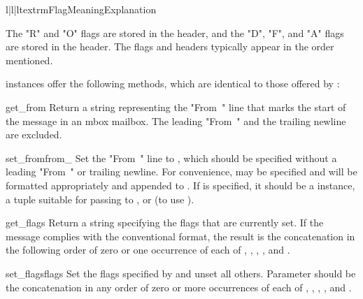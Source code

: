 \begin{tableiii}{l|l|l}{textrm}{Flag}{Meaning}{Explanation}
\end{tableiii}

The "R" and "O" flags are stored in the  header, and the
"D", "F", and "A" flags are stored in the  header. The
flags and headers typically appear in the order mentioned.

 instances offer the following methods, which are identical
to those offered by :

\begin{methoddesc}{get_from}{}
Return a string representing the "From~" line that marks the start of the
message in an mbox mailbox. The leading "From~" and the trailing newline are
excluded.
\end{methoddesc}

\begin{methoddesc}{set_from}{from_}
Set the "From~" line to , which should be specified without a
leading "From~" or trailing newline. For convenience,  may be
specified and will be formatted appropriately and appended to . If
 is specified, it should be a  instance, a tuple
suitable for passing to , or  (to use
).
\end{methoddesc}

\begin{methoddesc}{get_flags}{}
Return a string specifying the flags that are currently set. If the message
complies with the conventional format, the result is the concatenation in the
following order of zero or one occurrence of each of ,
, , , and .
\end{methoddesc}

\begin{methoddesc}{set_flags}{flags}
Set the flags specified by  and unset all others. Parameter
 should be the concatenation in any order of zero or more
occurrences of each of , , ,
, and .
\end{methoddesc}

